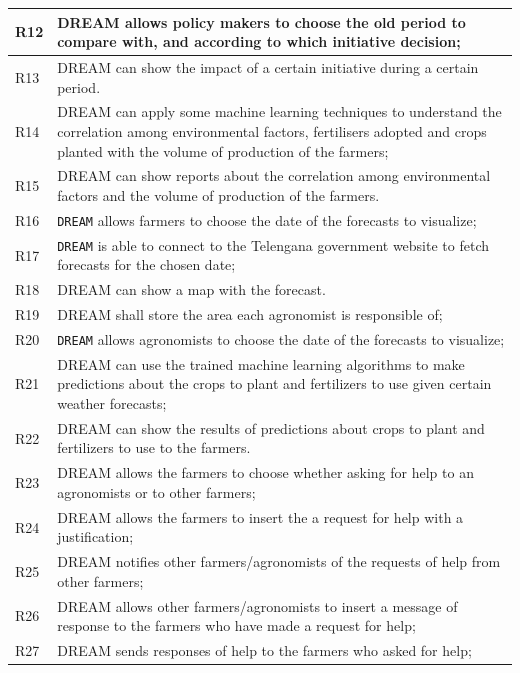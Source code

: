 \documentclass{article}
\begin{document}
\begin{longtable}[c]{|m{0.75cm}|m{11cm}|}
  \hline
R12\label{R} & DREAM allows policy makers to choose the old period to compare with, and according to which initiative decision;\\
  \hline
R13\label{R} & DREAM can show the impact of a certain initiative during a certain period.\\
  \hline
  R14\label{R} & DREAM can apply some machine learning techniques to understand the correlation among environmental factors, fertilisers adopted and crops planted with the volume of production of the farmers;\\
  \hline
R15\label{R} & DREAM can show reports about the correlation among environmental factors and the volume of production of the farmers.\\
  \hline
R16\label{R} & \verb|DREAM| allows farmers to choose the date of the forecasts to visualize;\\
  \hline
R17\label{R} & \verb|DREAM| is able to connect to the Telengana government website to fetch forecasts for the chosen date;\\
  \hline
R18\label{R} & DREAM can show a map with the forecast.\\
  \hline
R19\label{R} & DREAM shall store the area each agronomist is responsible of;\\
  \hline
R20\label{R} & \verb|DREAM| allows agronomists to choose the date of the forecasts to visualize;\\
  \hline
R21\label{R} & DREAM can use the trained machine learning algorithms to make predictions about the crops to plant and fertilizers to use given certain weather forecasts;\\
  \hline
R22\label{R} & DREAM can show the results of predictions about crops to plant and fertilizers to use to the farmers.\\
  \hline
R23\label{R} & DREAM allows the farmers to choose whether asking for help to an agronomists or to other farmers;\\
  \hline
R24\label{R} & DREAM allows the farmers to insert the a request for help with a justification;\\
  \hline
R25\label{R} & DREAM notifies other farmers/agronomists of the requests of help from other farmers;\\
  \hline
R26\label{R} & DREAM allows other farmers/agronomists to insert a message of response to the farmers who have made a request for help;\\
  \hline
R27\label{R} & DREAM sends responses of help to the farmers who asked for help;\\

\end{longtable}
\end{document}
